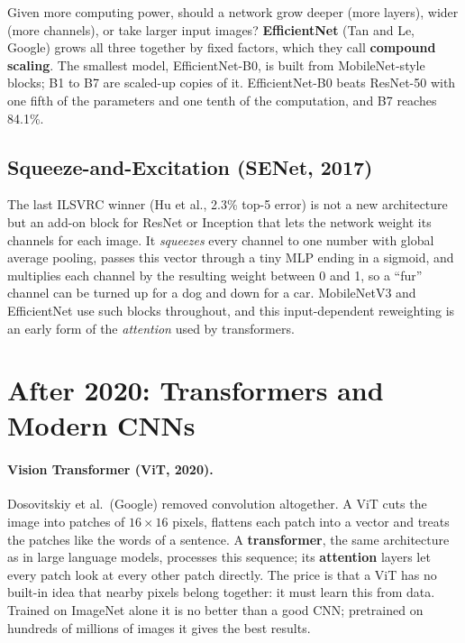 \documentclass[12pt, a4paper]{article}
\begin{document}
Given more computing power, should a network grow deeper (more layers), wider
(more channels), or take larger input images? \textbf{EfficientNet} (Tan and
Le, Google) grows all three together by fixed factors, which they call
\textbf{compound scaling}. The smallest model, EfficientNet-B0, is built from
MobileNet-style blocks; B1 to B7 are scaled-up copies of it. EfficientNet-B0
beats ResNet-50 with one fifth of the parameters and one tenth of the
computation, and B7 reaches 84.1\%.

\subsection{Squeeze-and-Excitation (SENet, 2017)}

The last ILSVRC winner (Hu et al., 2.3\% top-5 error) is not a new
architecture but an add-on block for ResNet or Inception that lets the network
weight its channels for each image. It \emph{squeezes} every channel to one
number with global average pooling, passes this vector through a tiny MLP
ending in a sigmoid, and multiplies each channel by the resulting weight
between 0 and 1, so a ``fur'' channel can be turned up for a dog and down for
a car. MobileNetV3 and EfficientNet use such blocks throughout, and this
input-dependent reweighting is an early form of the \emph{attention} used by
transformers.

\section{After 2020: Transformers and Modern CNNs}

\paragraph{Vision Transformer (ViT, 2020).}
Dosovitskiy et al.\ (Google) removed convolution altogether. A ViT cuts the
image into patches of $16 \times 16$ pixels, flattens each patch into a
vector and treats the patches like the words of a sentence. A
\textbf{transformer}, the same architecture as in large language models,
processes this sequence; its \textbf{attention} layers let every patch look at
every other patch directly. The price is that a ViT has no built-in idea that
nearby pixels belong together: it must learn this from data. Trained on
ImageNet alone it is no better than a good CNN; pretrained on hundreds of
millions of images it gives the best results.
\end{document}
